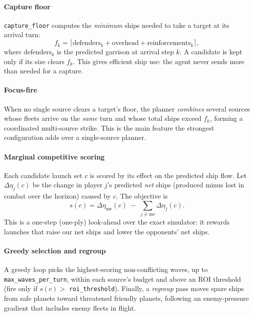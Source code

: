\documentclass[conference]{IEEEtran}
\begin{document}
\paragraph{Capture floor} \texttt{capture\_floor} computes the \emph{minimum} ships needed to take a target at its arrival turn:
\begin{equation}
f_k = \big\lceil \text{defenders}_k + \text{overhead} + \text{reinforcements}_k \big\rceil,
\end{equation}
where $\text{defenders}_k$ is the predicted garrison at arrival step $k$. A candidate is kept only if its size clears $f_k$. This gives efficient ship use: the agent never sends more than needed for a capture.

\paragraph{Focus-fire} When no single source clears a target's floor, the planner \emph{combines} several sources whose fleets arrive on the \emph{same} turn and whose total ships exceed $f_k$, forming a coordinated multi-source strike. This is the main feature the strongest configuration adds over a single-source planner.

\paragraph{Marginal competitive scoring} Each candidate launch set $c$ is scored by its effect on the predicted ship flow. Let $\Delta\eta_j(c)$ be the change in player $j$'s predicted \emph{net} ships (produced minus lost in combat over the horizon) caused by $c$. The objective is
\begin{equation}
\label{eq:comp}
s(c) = \Delta\eta_{\mathrm{me}}(c) \;-\; \sum_{j \neq \mathrm{me}} \Delta\eta_j(c).
\end{equation}
This is a one-step (one-ply) look-ahead over the exact simulator: it rewards launches that raise our net ships and lower the opponents' net ships.

\paragraph{Greedy selection and regroup} A greedy loop picks the highest-scoring non-conflicting waves, up to \texttt{max\_waves\_per\_turn}, within each source's budget and above an ROI threshold (fire only if $s(c)>$ \texttt{roi\_threshold}). Finally, a \emph{regroup} pass moves spare ships from safe planets toward threatened friendly planets, following an enemy-pressure gradient that includes enemy fleets in flight.
\end{document}
